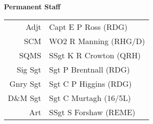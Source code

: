 \begin{center}
  \Large
  \textbf{Permanent Staff}
\end{center}

\begin{center}
  \begin{tabular}{rl}
    Adjt & Capt E P Ross (RDG) \\
    SCM & WO2 R Manning (RHG/D) \\
    SQMS & SSgt K R Crowton (QRH) \\
    Sig Sgt & Sgt P Brentnall (RDG) \\
    Gnry Sgt & Sgt C P Higgins (RDG) \\
    D\&M Sgt & Sgt C Murtagh (16/5L) \\
    Art & SSgt S Forshaw (REME) \\
  \end{tabular}
\end{center}
